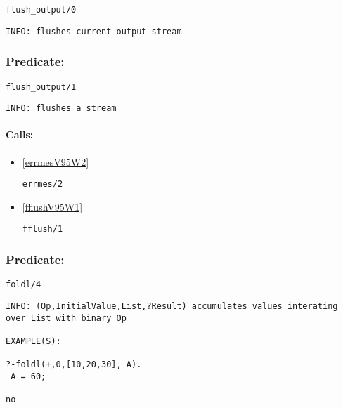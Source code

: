 \begin{verbatim}
flush_output/0
\end{verbatim}

{\small \begin{verbatim}
INFO: flushes current output stream

\end{verbatim}}

\subsubsection{Predicate:} \label{flushV95WoutputV95W1}

\begin{verbatim}
flush_output/1
\end{verbatim}

{\small \begin{verbatim}
INFO: flushes a stream

\end{verbatim}}
\paragraph{Calls:} 
\begin{itemize}
\item \ref{errmesV95W2} 
\begin{verbatim}
errmes/2
\end{verbatim}

\item \ref{fflushV95W1} 
\begin{verbatim}
fflush/1
\end{verbatim}

\end{itemize}

\subsubsection{Predicate:} \label{foldlV95W4}

\begin{verbatim}
foldl/4
\end{verbatim}

{\small \begin{verbatim}
INFO: (Op,InitialValue,List,?Result) accumulates values interating over List with binary Op

EXAMPLE(S):

?-foldl(+,0,[10,20,30],_A).
_A = 60;

no

\end{verbatim}}

